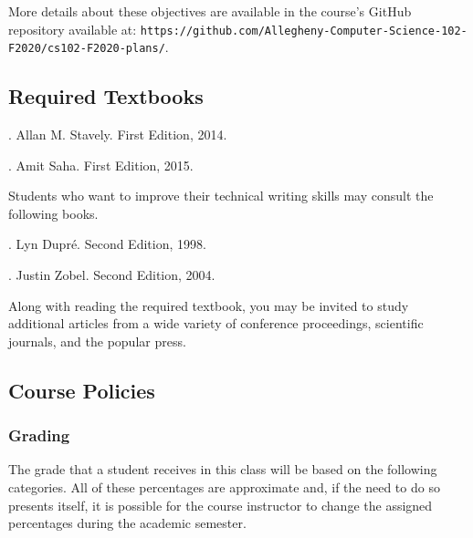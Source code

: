\documentclass[11pt]{article}
\newcommand{\url}[1]{\lstinline{#1}}
\begin{document}
\vspace*{.05in}

\noindent More details about these objectives are available in the course's
GitHub repository available at:
\url{https://github.com/Allegheny-Computer-Science-102-F2020/cs102-F2020-plans/}.

\subsection*{Required Textbooks}

. Allan M. Stavely. First Edition, 2014.

\vspace*{.1in}

. Amit Saha. First Edition, 2015.

\vspace*{.1in}

\noindent Students who want to improve their technical writing skills may
consult the following books.

\vspace*{.1in}

. Lyn Dupr\'e.
Second Edition, 1998.
%
\vspace*{.5em}

. Justin Zobel. Second Edition,
2004.

\vspace*{.1in}

\noindent Along with reading the required textbook, you may be invited to study
additional articles from a wide variety of conference proceedings, scientific
journals, and the popular press.

\vspace*{-.5em}

\subsection*{Course Policies}

\subsubsection*{Grading}

The grade that a student receives in this class will be based on the following
categories. All of these percentages are approximate and, if the need to do so
presents itself, it is possible for the course instructor to change the assigned
percentages during the academic semester.
\end{document}
